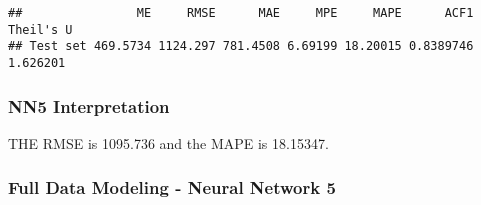 \documentclass[
]{article}
\newenvironment{Shaded}{\begin{snugshade}}{\end{snugshade}}
\newcommand{\CommentTok}[1]{\textcolor[rgb]{0.56,0.35,0.01}{\textit{#1}}}
\newcommand{\FunctionTok}[1]{\textcolor[rgb]{0.00,0.00,0.00}{#1}}
\newcommand{\NormalTok}[1]{#1}
\newcommand{\OtherTok}[1]{\textcolor[rgb]{0.56,0.35,0.01}{#1}}
\newcommand{\SpecialCharTok}[1]{\textcolor[rgb]{0.00,0.00,0.00}{#1}}
\begin{document}
\begin{Shaded}
\end{Shaded}

\begin{verbatim}
##                ME     RMSE      MAE     MPE     MAPE      ACF1 Theil's U
## Test set 469.5734 1124.297 781.4508 6.69199 18.20015 0.8389746  1.626201
\end{verbatim}

\begin{Shaded}
\end{Shaded}

\hypertarget{nn5-interpretation-1}{%
\subsubsection{NN5 Interpretation}\label{nn5-interpretation-1}}

THE RMSE is 1095.736 and the MAPE is 18.15347.

\hypertarget{full-data-modeling---neural-network-5}{%
\subsubsection{Full Data Modeling - Neural Network
5}\label{full-data-modeling---neural-network-5}}
\end{document}
